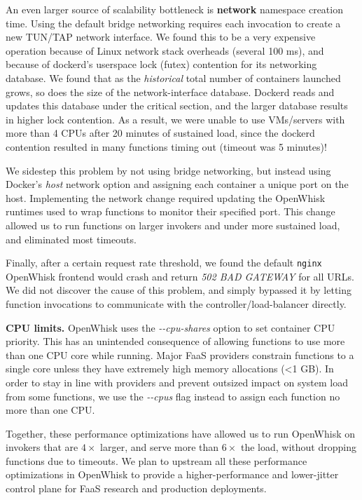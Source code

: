 An even larger source of scalability bottleneck is \textbf{network} namespace creation time.
Using the default bridge networking requires each invocation to create a new TUN/TAP network interface.
We found this to be a very expensive operation because of Linux network stack overheads (several 100 ms), and because of dockerd's userspace lock (futex) contention for its networking database. 
We found that as the \emph{historical} total number of containers launched grows, so does the size of the network-interface database.
Dockerd reads and updates this database under the critical section, and the larger database results in higher lock contention.
As a result, we were unable to use VMs/servers with more than 4 CPUs after 20 minutes of sustained load, since the dockerd contention resulted in many functions timing out (timeout was 5 minutes)! 

We sidestep this problem by not using bridge networking, but instead using Docker's \textit{host} network option and assigning each container a unique port on the host. 
Implementing the network change required updating the OpenWhisk runtimes used to wrap functions to monitor their specified port.
This change allowed us to run functions on larger invokers and under more sustained load, and eliminated most timeouts. 

Finally, after a certain request rate threshold, we found the default \texttt{nginx} OpenWhisk frontend would crash and return \textit{502 BAD GATEWAY} for all URLs. 
We did not discover the cause of this problem, and simply bypassed it by letting function invocations to communicate with the controller/load-balancer directly. 

\noindent \textbf{CPU limits.} 
OpenWhisk uses the \textit{-{}-cpu-shares} option to set container CPU priority.
This has an unintended consequence of allowing functions to use more than one CPU core while running.
Major FaaS providers constrain functions to a single core unless they have extremely high memory allocations (<1 GB).
In order to stay in line with providers and prevent outsized impact on system load from some functions, we use the \textit{-{}-cpus} flag instead to assign each function no more than one CPU.

Together, these performance optimizations have allowed us to run OpenWhisk on invokers that are $4\times$ larger, and serve more than $6\times$ the load, without dropping functions due to timeouts.
%
We plan to upstream all these performance optimizations in OpenWhisk to provide a higher-performance and lower-jitter control plane for FaaS research and production deployments. 

